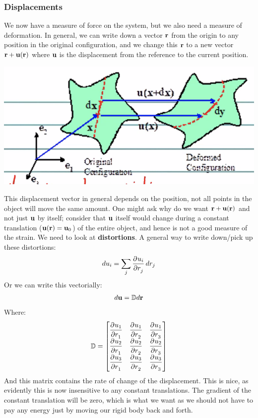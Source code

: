 \documentclass[../PHYS306Notes.tex]{subfiles}
\begin{document}
\subsubsection{Displacements}
We now have a measure of force on the system, but we also need a measure of deformation. In general, we can write down a vector $\mathbf{r}$ from the origin to any position in the original configuration, and we change this $\mathbf{r}$ to a new vector $\mathbf{r} + \mathbf{u}(\mathbf{r})$ where $\mathbf{u}$ is the displacement from the reference to the current position. 
\begin{center}
    \includegraphics[scale=0.8]{Lecture-31/l31-img3.png}
\end{center}
This displacement vector in general depends on the position, not all points in the object will move the same amount. One might ask why do we want $\mathbf{r} + \mathbf{u}(\mathbf{r})$ and not just $\mathbf{u}$ by itself; consider that $\mathbf{u}$ itself would change during a constant translation ($\mathbf{u}(\mathbf{r}) = \mathbf{u}_0$) of the entire object, and hence is not a good measure of the strain. We need to look at \textbf{distortions}. A general way to write down/pick up these distortions:
\[du_i = \sum_{j}\dpd{u_i}{r_j}dr_j\]
Or we can write this vectorially:
\[d\mathbf{u} = \mathbb{D} d\mathbf{r}\]
Where:
\[\DD = \m{\dpd{u_1}{r_1} & \dpd{u_1}{r_2} & \dpd{u_1}{r_3} \\ \dpd{u_2}{r_1} & \dpd{u_2}{r_2} & \dpd{u_2}{r_3} \\
\dpd{u_3}{r_1} & \dpd{u_3}{r_2} & \dpd{u_3}{r_3}}\]
And this matrix contains the rate of change of the displacement. This is nice, as evidently this is now insensitive to any constant translations. The gradient of the constant translation will be zero, which is what we want as we should not have to pay any energy just by moving our rigid body back and forth.
\end{document}
